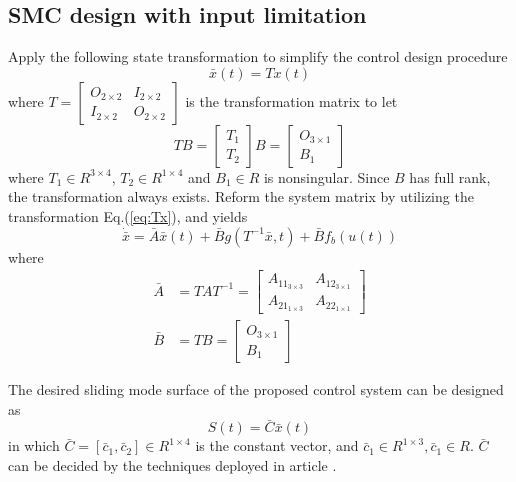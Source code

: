 \documentclass[3p]{elsarticle}
\theoremstyle{plain}
\begin{document}
\subsection{SMC design with input limitation}
Apply the following state transformation to simplify the control design procedure
\begin{equation}
\bar{x}(t) = Tx(t)\label{eq:Tx}
\end{equation}
where $T=\begin{bmatrix}O_{2\times 2} &I_{2\times 2}\\ I_{2\times 2} &O_{2\times 2}\end{bmatrix}$ is the transformation matrix to let
\begin{equation}
TB =
\begin{bmatrix}
T_1\\T_2
\end{bmatrix}B
=
\begin{bmatrix}
O_{3 \times 1}\\B_1
\end{bmatrix}\label{eq:TB}
\end{equation}
where $T_1 \in R^{3\times 4}$, $T_2 \in R^{1 \times 4}$ and $B_1 \in R$ is nonsingular. Since $B$ has full rank, the transformation always exists. Reform the system matrix by utilizing the transformation Eq.(\ref{eq:Tx}), and yields
\begin{equation}
\dot{\bar{x}} = \bar{A}\bar{x}(t) + \bar{B} g(T^{-1}\bar{x},t) + \bar{B} f_b(u(t)) \label{eq:barABC}
\end{equation}
where
\begin{align*}
\bar{A} &= TAT^{-1}=\begin{bmatrix}
A_{11_{3\times 3}}
&A_{12_{3\times 1}}\\
A_{21_{1\times 3}}
&A_{22_{1\times 1}}\end{bmatrix}\\
\bar{B} &= TB = \begin{bmatrix}O_{3\times 1}\\B_{1}\end{bmatrix}
\end{align*}\par
The desired sliding mode surface of the proposed control system can be designed as
\begin{equation}
S(t) = \bar{C}\bar{x}(t)\label{eq:S}
\end{equation}
in which $\bar{C} = [\bar{c}_1,\bar{c}_2]\in R^{1\times 4}$ is the constant vector, and $\bar{c}_1\in R^{1\times 3},\bar{c}_1\in R$. $\bar{C}$ can be decided by the techniques deployed in article \cite{lyshevski2012control}.\par
\end{document}
